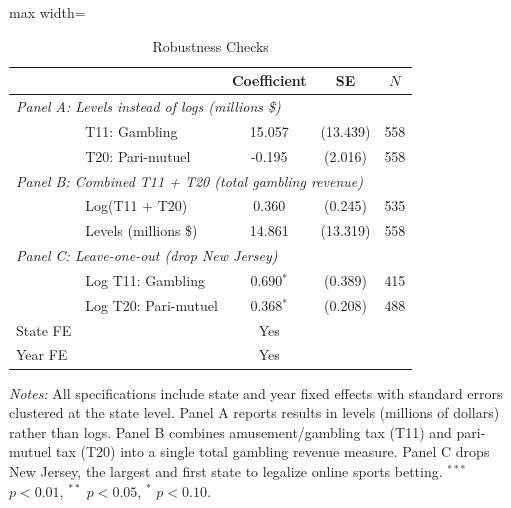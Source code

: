 \begin{table}[htbp]
\centering
\caption{Robustness Checks}
\label{tab:robustness}
\begin{adjustbox}{max width=\textwidth}
\begin{tabular}{llccc}
\hline\hline
 & & Coefficient & SE & $N$ \\
\hline
\multicolumn{5}{l}{\textit{Panel A: Levels instead of logs (millions \$)}} \\
& T11: Gambling & 15.057 & (13.439) & 558 \\
& T20: Pari-mutuel & -0.195 & (2.016) & 558 \\
[0.5em]
\multicolumn{5}{l}{\textit{Panel B: Combined T11 + T20 (total gambling revenue)}} \\
& Log(T11 + T20) & 0.360 & (0.245) & 535 \\
& Levels (millions \$) & 14.861 & (13.319) & 558 \\
[0.5em]
\multicolumn{5}{l}{\textit{Panel C: Leave-one-out (drop New Jersey)}} \\
& Log T11: Gambling & 0.690$^{*}$ & (0.389) & 415 \\
& Log T20: Pari-mutuel & 0.368$^{*}$ & (0.208) & 488 \\
\hline
State FE & & Yes & & \\
Year FE & & Yes & & \\
\hline\hline
\end{tabular}
\end{adjustbox}
\begin{minipage}{0.95\textwidth}
\vspace{0.3em}
\footnotesize \textit{Notes:} All specifications include state and year fixed effects with standard errors clustered at the state level. Panel A reports results in levels (millions of dollars) rather than logs. Panel B combines amusement/gambling tax (T11) and pari-mutuel tax (T20) into a single total gambling revenue measure. Panel C drops New Jersey, the largest and first state to legalize online sports betting. $^{***}$ $p<0.01$, $^{**}$ $p<0.05$, $^{*}$ $p<0.10$.
\end{minipage}
\end{table}

